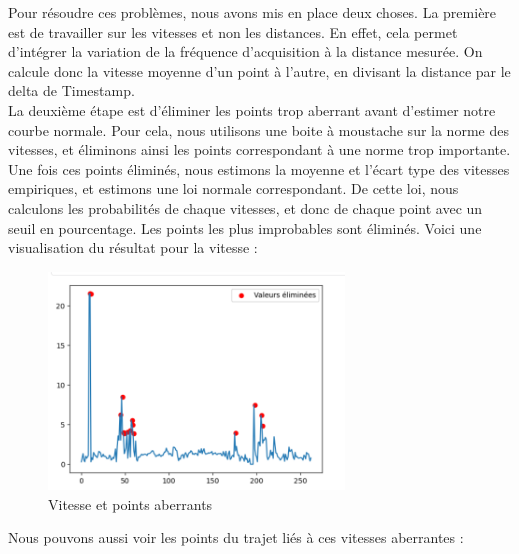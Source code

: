 Pour résoudre ces problèmes, nous avons mis en place deux choses. La première est de travailler sur les vitesses et non les distances. En effet, cela permet d'intégrer la variation de la fréquence d'acquisition à la distance mesurée. On calcule donc la vitesse moyenne d'un point à l'autre, en divisant la distance par le delta de Timestamp. \\

La deuxième étape est d'éliminer les points trop aberrant avant d'estimer notre courbe normale. Pour cela, nous utilisons une boite à moustache sur la norme des vitesses, et éliminons ainsi les points correspondant à une norme trop importante. \\

Une fois ces points éliminés, nous estimons la moyenne et l'écart type des vitesses empiriques, et estimons une loi normale correspondant. De cette loi, nous calculons les probabilités de chaque vitesses, et donc de chaque point avec un seuil en pourcentage. Les points les plus improbables sont éliminés. Voici une visualisation du résultat pour la vitesse :

\begin{figure}[H]
    \centering
    \includegraphics[width=0.7\textwidth]{visualisation_vitesse_points_aberants.png} %
    \caption{Vitesse et points aberrants}
    \label{fig:Vitesse et points aberrants}
\end{figure}

Nous pouvons aussi voir les points du trajet liés à ces vitesses aberrantes :

